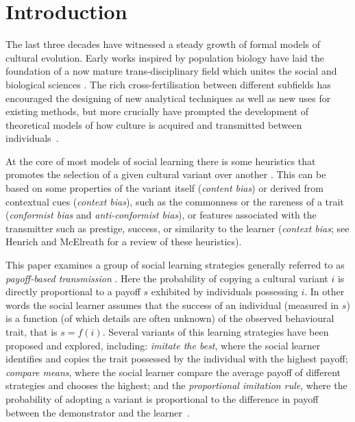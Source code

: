 \documentclass[review,authoryear]{elsarticle}
\begin{document}
\section{Introduction}

The last three decades have witnessed a steady growth of formal models of cultural evolution. Early works inspired by population biology \citep{cavallisforza_feldman_1981,boyd1985} have laid the foundation of a now mature trans-disciplinary field which unites the social and biological sciences \citep{mesoudi_etal_2006, mcelreath_and_boyd_2007}. The rich cross-fertilisation between different subfields has encouraged the designing of new analytical techniques as well as new uses for existing methods, but more crucially have prompted the development of theoretical models of how culture is acquired and transmitted between individuals~\citep{henrich_mcelreath2003,laland2004,mcelreath_and_boyd_2007,shennan_2009_patternprocess,Kempe_and_Mesoudi_2014,mesoudi_cultural_2015}. 

At the core of most models of social learning there is some heuristics that promotes the selection of a given cultural variant over another \citep{laland2004}. This can be based on some properties of the variant itself (\emph{content bias}) or derived from contextual cues (\emph{context bias}), such as the commonness or the rareness of a trait (\emph{conformist bias} and \emph{anti-conformist bias}), or  features associated with the transmitter such as prestige, success, or similarity to the learner (\emph{context bias}; see Henrich and McElreath \citeyear{henrich_mcelreath2003} for a review of these heuristics). 

This paper examines a group of social learning strategies generally referred to as \emph{payoff-based transmission} \citep{schlag1998,kendal_etal_2009,lake_and_crema_2012,baldini2013,kandler_and_laland_2013,crema_lake_inpress}. Here the probability of copying a cultural variant $i$ is directly proportional to a payoff $s$ exhibited by individuals possessing $i$. In other words the social learner assumes that the success of an individual (measured in $s$) is a function (of which details are often unknown) of the observed behavioural trait, that is $s=f(i)$. Several variants of this learning strategies have been proposed and explored, including: \emph{imitate the best}, where the social learner identifies and copies the trait possessed by the individual with the highest payoff; \emph{compare means}, where the social learner compare the average payoff of different strategies and chooses the highest; and the \emph{proportional imitation rule}, where the probability of adopting a variant is proportional to the difference in payoff between the demonstrator and the learner~\citep{schlag1998,baldini2013,crema_lake_inpress}. 
\end{document}
